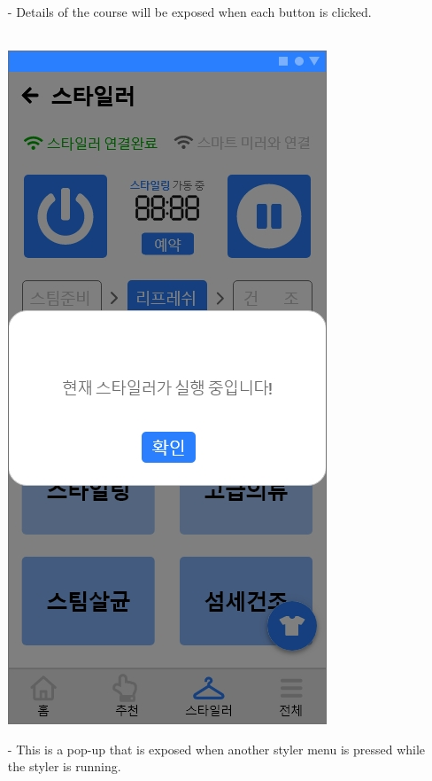 \documentclass[conference]{IEEEtran}
\begin{document}
\begin{enumerate}
 \item[-]Details of the course will be exposed when each button is clicked. \\\\
   \centerline{\includegraphics[scale=0.32]{스타일러7.jpg}}
 \item[-]This is a pop-up that is exposed when another styler menu is pressed while the styler is running. \\\\
 \end{enumerate}
 
\end{document}
